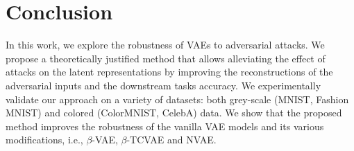 
\section{Conclusion}
In this work, we explore the robustness of VAEs to adversarial attacks.  We propose a theoretically justified method that allows alleviating the effect of attacks on the latent representations by improving the reconstructions of the adversarial inputs and the downstream tasks accuracy. We experimentally validate our approach on a variety of datasets: both grey-scale (MNIST, Fashion MNIST) and colored (ColorMNIST, CelebA) data. We show that the proposed method improves the robustness of the vanilla VAE models and its various modifications, i.e., $\beta$-VAE, $\beta$-TCVAE and NVAE.

